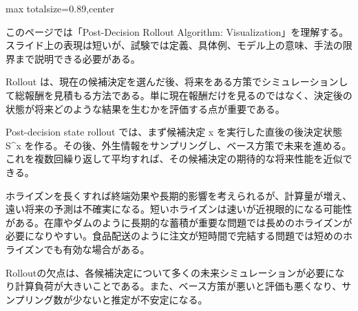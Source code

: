 \begin{minipage}[t]{0.58\textwidth}
\begin{adjustbox}{max totalsize={\textwidth}{0.89\textheight},center}
\begin{minipage}{\textwidth}\scriptsize
{}このページでは「Post-Decision Rollout Algorithm: Visualization」を理解する。スライド上の表現は短いが、試験では定義、具体例、モデル上の意味、手法の限界まで説明できる必要がある。\par
Rollout は、現在の候補決定を選んだ後、将来をある方策でシミュレーションして総報酬を見積もる方法である。単に現在報酬だけを見るのではなく、決定後の状態が将来どのような結果を生むかを評価する点が重要である。\par
Post-decision state rollout では、まず候補決定 x を実行した直後の後決定状態 S\textasciicircum{}x を作る。その後、外生情報をサンプリングし、ベース方策で未来を進める。これを複数回繰り返して平均すれば、その候補決定の期待的な将来性能を近似できる。\par
ホライズンを長くすれば終端効果や長期的影響を考えられるが、計算量が増え、遠い将来の予測は不確実になる。短いホライズンは速いが近視眼的になる可能性がある。在庫やダムのように長期的な蓄積が重要な問題では長めのホライズンが必要になりやすい。食品配送のように注文が短時間で完結する問題では短めのホライズンでも有効な場合がある。\par
Rolloutの欠点は、各候補決定について多くの未来シミュレーションが必要になり計算負荷が大きいことである。また、ベース方策が悪いと評価も悪くなり、サンプリング数が少ないと推定が不安定になる。\par

\end{minipage}
\end{adjustbox}
\end{minipage}
